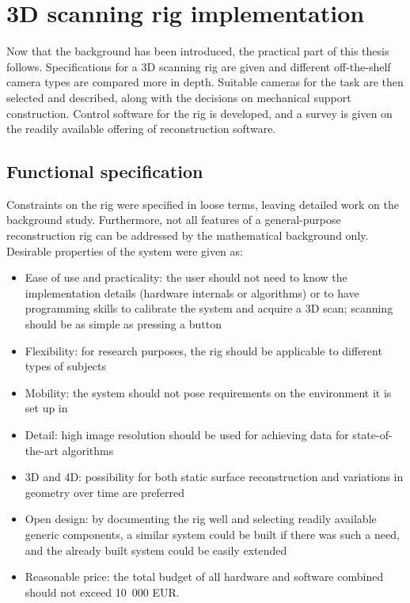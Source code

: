 \section{3D scanning rig implementation} \label{sec:implementation}

Now that the background has been introduced, the practical part of this thesis follows.
Specifications for a 3D scanning rig are given and different off-the-shelf camera types are compared more in depth.
Suitable cameras for the task are then selected and described, along with the decisions on mechanical support construction.
Control software for the rig is developed, and a survey is given on the readily available offering of reconstruction software.

\subsection{Functional specification} %

Constraints on the rig were specified in loose terms, leaving detailed work on the background study.
Furthermore, not all features of a general-purpose reconstruction rig can be addressed by the mathematical background only.
Desirable properties of the system were given as:

\begin{itemize}
	\item Ease of use and practicality: the user should not need to know the implementation details (hardware internals or algorithms) or to have programming skills to calibrate the system and acquire a 3D scan; scanning should be as simple as pressing a button
	\item Flexibility: for research purposes, the rig should be applicable to different types of subjects
	\item Mobility: the system should not pose requirements on the environment it is set up in
	\item Detail: high image resolution should be used for achieving data for state-of-the-art algorithms
	\item 3D and 4D: possibility for both static surface reconstruction and variations in geometry over time are preferred
	\item Open design: by documenting the rig well and selecting readily available generic components, a similar system could be built if there was such a need, and the already built system could be easily extended
	\item Reasonable price: the total budget of all hardware and software combined should not exceed 10~000 EUR.%
\end{itemize}

